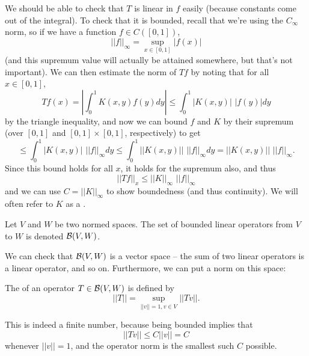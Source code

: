 We should be able to check that $T$ is linear in $f$ easily (because constants come out of the integral). To check that it is bounded, recall that we're using the $C_{\infty}$ norm, so if we have a function $f \in C([0, 1])$, \[
    ||f||_{\infty} = \sup_{x \in [0, 1]} |f(x)|
\]
(and this supremum value will actually be attained somewhere, but that's not important). We can then estimate the norm of $Tf$ by noting that for all $x \in [0, 1]$,
\[
    Tf(x) = \left|\int_0^1 K(x, y) f(y) dy\right| \le \int_0^1 |K(x, y)| \, \, |f(y)| dy
\]
by the triangle inequality, and now we can bound $f$ and $K$ by their supremum (over $[0, 1]$ and $[0, 1] \times [0, 1]$, respectively) to get 
\[
    \le \int_0^1 |K(x, y)| \, \, ||f||_{\infty} dy \le \int_0^1 ||K(x, y)|| \, \, ||f||_{\infty} dy = ||K(x, y)|| \, \,  ||f||_{\infty}.
\]
Since this bound holds for all $x$, it holds for the supremum also, and thus
\[
    ||Tf||_x \le ||K||_{\infty} \, \, ||f||_{\infty}
\]
and we can use $C = ||K||_{\infty}$ to show boundedness (and thus continuity). We will often refer to $K$ as a .

\begin{definition}
Let $V$ and $W$ be two normed spaces. The set of bounded linear operators from $V$ to $W$ is denoted $\mathcal{B}(V, W)$.
\end{definition}

We can check that $\mathcal{B}(V, W)$ is a vector space -- the sum of two linear operators is a linear operator, and so on. Furthermore, we can put a norm on this space: 

\begin{definition}
The  of an operator $T \in \mathcal{B}(V, W)$ is defined by
\[
    ||T|| = \sup_{||v|| = 1, v \in V} ||Tv||.
\]
\end{definition}

This is indeed a finite number, because being bounded implies that
\[
    ||Tv|| \le C||v|| = C
\]  
whenever $||v|| = 1$, and the operator norm is the smallest such $C$ possible.

